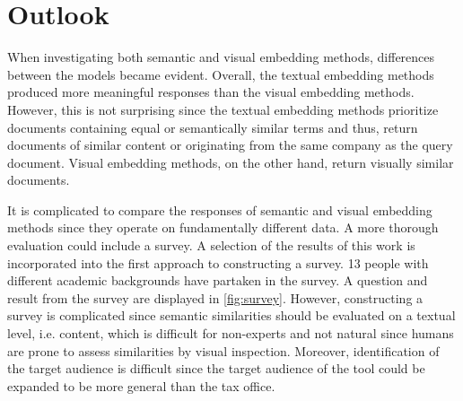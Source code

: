 \section{Outlook}\label{sec:outlook}

When investigating both semantic and visual embedding methods, differences between the models became evident.
Overall, the textual embedding methods produced more meaningful responses than the visual embedding methods.
However, this is not surprising since the textual embedding methods prioritize documents containing equal or semantically similar terms and thus,
return documents of similar content or originating from the same company as the query document.
Visual embedding methods, on the other hand, return visually similar documents.

It is complicated to compare the responses of semantic and visual embedding methods since they operate on fundamentally different data.
A more thorough evaluation could include a survey.
A selection of the results of this work is incorporated into the first approach to constructing a survey.
13 people with different academic backgrounds have partaken in the survey.
A question and result from the survey are displayed in \autoref{fig:survey}.
However, constructing a survey is complicated since semantic similarities should be evaluated on a textual level, i.e. content, 
which is difficult for non-experts and not natural since humans are prone to assess similarities by visual inspection.
Moreover, identification of the target audience is difficult since the target audience of the tool could be expanded to be more general than the tax office.

